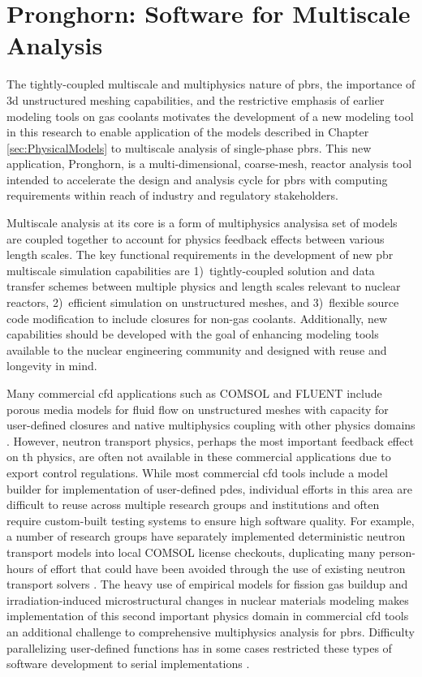 \chapter{Pronghorn: Software for Multiscale Analysis}
\label{sec:ph}

The tightly-coupled multiscale and multiphysics nature of \glspl{pbr}, the importance of \gls{3d} unstructured meshing capabilities, and the restrictive emphasis of earlier modeling tools on gas coolants motivates the development of a new modeling tool in this research to enable application of the models described in Chapter \ref{sec:PhysicalModels} to multiscale analysis of single-phase \glspl{pbr}. This new application, Pronghorn, is a multi-dimensional, coarse-mesh, reactor analysis tool intended to accelerate the design and analysis cycle for \glspl{pbr} with computing requirements within reach of industry and regulatory stakeholders. 

Multiscale analysis at its core is a form of multiphysics analysis\mdash a set of models are coupled together to account for physics feedback effects between various length scales. The key functional requirements in the development of new \gls{pbr} multiscale simulation capabilities are 1)~tightly-coupled solution and data transfer schemes between multiple physics and length scales relevant to nuclear reactors, 2)~efficient simulation on unstructured meshes, and 3)~flexible source code modification to include closures for non-gas coolants. Additionally, new capabilities should be developed with the goal of enhancing modeling tools available to the nuclear engineering community and designed with reuse and longevity in mind.

Many commercial \gls{cfd} applications such as COMSOL and FLUENT include porous media models for fluid flow on unstructured meshes with capacity for user-defined closures and native multiphysics coupling with other physics domains \cite{comsol_cfd,fluent}. However, neutron transport physics, perhaps the most important feedback effect on \gls{th} physics, are often not available in these commercial applications due to export control regulations. While most commercial \gls{cfd} tools include a model builder for implementation of user-defined \glspl{pde}, individual efforts in this area are difficult to reuse across multiple research groups and institutions and often require custom-built testing systems to ensure high software quality. For example, a number of research groups have separately implemented deterministic neutron transport models into local COMSOL license checkouts, duplicating many person-hours of effort that could have been avoided through the use of existing neutron transport solvers \cite{xin_wang,hurt,chandler,xoubi,fiorina}. The heavy use of empirical models for fission gas buildup and irradiation-induced microstructural changes in nuclear materials modeling makes implementation of this second important physics domain in commercial \gls{cfd} tools an additional challenge to comprehensive multiphysics analysis for \glspl{pbr}. Difficulty parallelizing user-defined functions has in some cases restricted these types of software development to serial implementations \cite{becker}.

